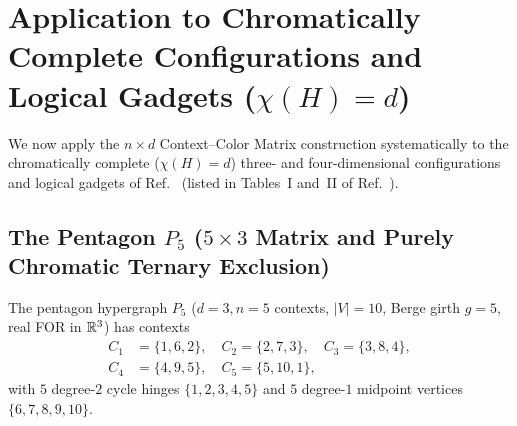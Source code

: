 \documentclass[aps,pra,reprint,superscriptaddress,longbibliography,nofootinbib,floatfix,10pt]{revtex4-2}
\theoremstyle{definition}\newtheorem{definition}[theorem]{Definition}
\theoremstyle{remark}\newtheorem{remark}[theorem]{Remark}
\begin{document}
\section{Application to Chromatically Complete Configurations and Logical Gadgets (\texorpdfstring{$\chi(H)=d$}{chi(H)=d})}\label{sec:exact-palette}

We now apply the $n\times d$ Context--Color Matrix construction systematically to the chromatically complete ($\chi(H)=d$) three- and four-dimensional configurations and logical gadgets of Ref.~\cite{svozil-2025-color} (listed in Tables~I and~II of Ref.~\cite{svozil-2025-color}).

\subsection{The Pentagon \texorpdfstring{$P_5$}{P5} (\texorpdfstring{$5\times 3$}{5x3} Matrix and Purely Chromatic Ternary Exclusion)}\label{sec:P5}

The pentagon hypergraph $P_5$ ($d=3,n=5$ contexts, $|V|=10$, Berge girth $g=5$, real FOR in $\mathbb R^3$) has contexts
\begin{equation}\label{eq:P5-contexts}
\begin{aligned}
C_1&=\{1,6,2\},\quad C_2=\{2,7,3\},\quad C_3=\{3,8,4\},\\
C_4&=\{4,9,5\},\quad C_5=\{5,10,1\},
\end{aligned}
\end{equation}
with $5$ degree-$2$ cycle hinges $\{1,2,3,4,5\}$ and $5$ degree-$1$ midpoint vertices $\{6,7,8,9,10\}$.
\end{document}
